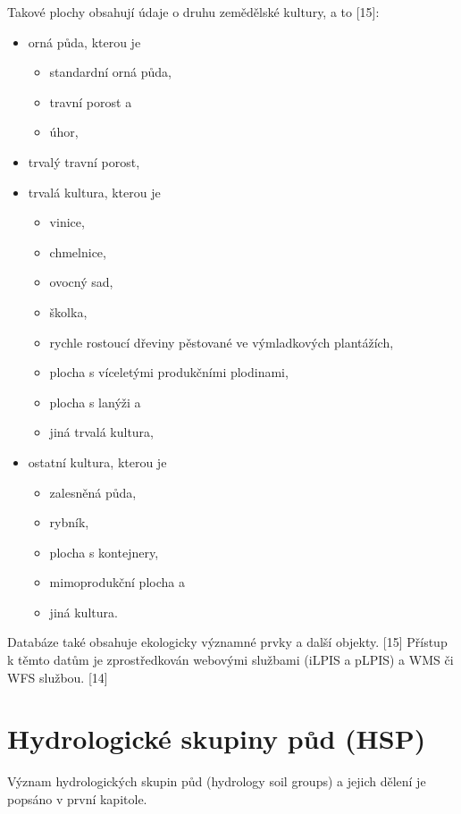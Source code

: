 \documentclass[a4paper,oneside,12pt]{book}
\begin{document}
Takové plochy obsahují údaje o druhu zemědělské kultury, a to [15]:
\begin{itemize}
    \item orná půda, kterou je
    \begin{itemize}
        \item standardní orná půda,
        \item travní porost a
        \item úhor,
    \end{itemize}
    \item trvalý travní porost,
    \item trvalá kultura, kterou je
    \begin{itemize}
        \item vinice,
        \item chmelnice,
        \item ovocný sad,
        \item školka,
        \item rychle rostoucí dřeviny pěstované ve výmladkových plantážích,
        \item plocha s víceletými produkčními plodinami,
        \item plocha s lanýži a
        \item jiná trvalá kultura, 
    \end{itemize}
    \item ostatní kultura, kterou je
    \begin{itemize}
        \item zalesněná půda,
        \item rybník,
        \item plocha s kontejnery,
        \item mimoprodukční plocha a
        \item jiná kultura.
    \end{itemize}
\end{itemize}

\hspace{10mm} Databáze také obsahuje ekologicky významné prvky a další objekty. [15]
Přístup k těmto datům je zprostředkován webovými službami (iLPIS a pLPIS)  a WMS či WFS službou. [14]

\section{Hydrologické skupiny půd (HSP)} \label{hsp}
Význam hydrologických skupin půd (hydrology soil groups) a jejich dělení je popsáno v první kapitole. 
\end{document}
